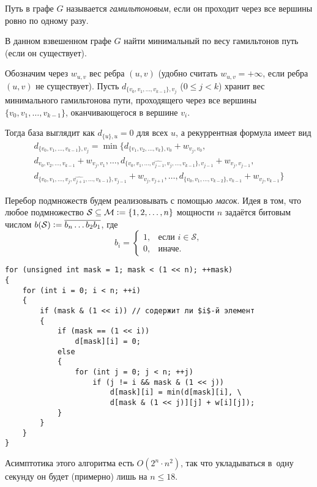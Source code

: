 \begin{definition}
    Путь в графе $G$ называется \textit{гамильтоновым}, если он проходит через все вершины ровно по одному разу.
\end{definition}

\begin{problem}
    В данном взвешенном графе $G$ найти минимальный по весу гамильтонов путь (если он существует).
\end{problem}

Обозначим через $w_{u, v}$ вес ребра $(u, v)$ (удобно считать $w_{u, v} = +\infty$, если ребра $(u, v)$ не существует). Пусть $d_{\{v_0, v_1, \ldots, v_{k - 1}\}, v_j}$ ($0 \leqslant j < k$) хранит вес минимального гамильтонова пути, проходящего через все вершины $\{v_0, v_1, \ldots, v_{k - 1}\}$, оканчивающегося в вершине $v_i$.

Тогда база выглядит как $d_{\{u\}, u} = 0$ для всех $u$, а рекуррентная формула имеет вид
\begin{multline*}
    d_{\{v_0, v_1, \ldots, v_{k - 1}\}, v_j} = \min\{d_{\{v_1, v_2, \ldots, v_k\}, v_0} + w_{v_j, v_0},\\ d_{v_0, v_2, \ldots, v_{k - 1}} + w_{v_j, v_1}, \ldots, d_{\{v_0, v_1, \ldots, \widehat{v_{j - 1}}, v_j, \ldots, v_{k - 1}\}, v_{j - 1}} + w_{v_j, v_{j - 1}},\\ d_{\{v_0, v_1, \ldots,  v_j, \widehat{v_{j + 1}}, \ldots, v_{k - 1}\}, v_{j - 1}} + w_{v_j, v_{j + 1}}, \ldots, d_{\{v_0, v_1, \ldots, v_{k - 2}\}, v_{k - 1}} + w_{v_j, v_{k - 1}}\}
\end{multline*}

Перебор подмножеств будем реализовывать с помощью \textit{масок}. Идея в том, что любое подмножество $\mathcal{S} \subseteq \mathcal{M} \vcentcolon = \{1, 2, \ldots, n\}$ мощности $n$ задаётся битовым числом $b(\mathcal{S}) \vcentcolon = \overline{b_n\ldots b_2b_1}$, где
\[
    b_i =
    \begin{cases}
        1,&\text{если $i \in \mathcal{S}$},\\
        0,&\text{иначе}.
    \end{cases}
\]

\begin{verbatim}
for (unsigned int mask = 1; mask < (1 << n); ++mask)
{
    for (int i = 0; i < n; ++i)
    {
        if (mask & (1 << i)) // содержит ли $i$-й элемент
        {
            if (mask == (1 << i))
                d[mask][i] = 0;
            else
            {
                for (int j = 0; j < n; ++j)
                    if (j != i && mask & (1 << j))
                        d[mask][i] = min(d[mask][i], \
                        d[mask & (1 << j)][j] + w[i][j]);
            }
        }
    }
}
\end{verbatim}

Асимптотика этого алгоритма есть $O(2^n \cdot n^2)$, так что укладываться в~одну секунду он будет (примерно) лишь на $n \leqslant 18$.
